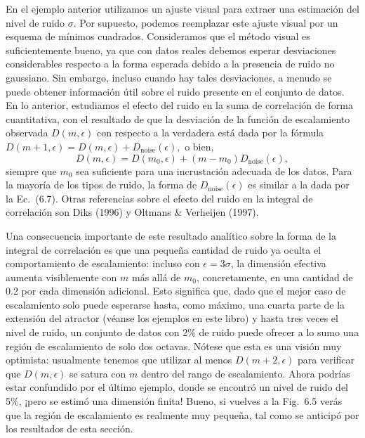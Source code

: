 \documentclass[10pt,a4paper]{book}
\begin{document}
En el ejemplo anterior utilizamos un ajuste visual para extraer una estimación del nivel de ruido $\sigma$. Por supuesto, podemos reemplazar este ajuste visual por un esquema de mínimos cuadrados. Consideramos que el método visual es suficientemente bueno, ya que con datos reales debemos esperar desviaciones considerables respecto a la forma esperada debido a la presencia de ruido no gaussiano. Sin embargo, incluso cuando hay tales desviaciones, a menudo se puede obtener información útil sobre el ruido presente en el conjunto de datos. En lo anterior, estudiamos el efecto del ruido en la suma de correlación de forma cuantitativa, con el resultado de que la desviación de la función de escalamiento observada $D(m, \epsilon)$ con respecto a la verdadera está dada por la fórmula $D(m+1, \epsilon) = D(m, \epsilon) + D_{\text{noise}}(\epsilon),$ o bien,
\begin{equation}
D(m, \epsilon) = D(m_0, \epsilon) + (m - m_0) D_{\text{noise}}(\epsilon),
\end{equation}
siempre que $m_0$ sea suficiente para una incrustación adecuada de los datos. Para la mayoría de los tipos de ruido, la forma de $D_{\text{noise}}(\epsilon)$ es similar a la dada por la Ec.~(6.7). Otras referencias sobre el efecto del ruido en la integral de correlación son Diks (1996) y Oltmans \& Verheijen (1997).

\bigskip

Una consecuencia importante de este resultado analítico sobre la forma de la integral de correlación es que una pequeña cantidad de ruido ya oculta el comportamiento de escalamiento: incluso con $\epsilon = 3\sigma$, la dimensión efectiva aumenta visiblemente con $m$ más allá de $m_0$, concretamente, en una cantidad de 0.2 por cada dimensión adicional. Esto significa que, dado que el mejor caso de escalamiento solo puede esperarse hasta, como máximo, una cuarta parte de la extensión del atractor (véanse los ejemplos en este libro) y hasta tres veces el nivel de ruido, un conjunto de datos con 2\% de ruido puede ofrecer a lo sumo una región de escalamiento de solo dos octavas. Nótese que esta es una visión muy optimista: usualmente tenemos que utilizar al menos $D(m+2, \epsilon)$ para verificar que $D(m, \epsilon)$ se satura con $m$ dentro del rango de escalamiento. Ahora podrías estar confundido por el último ejemplo, donde se encontró un nivel de ruido del 5\%, ¡pero se estimó una dimensión finita! Bueno, si vuelves a la Fig.~6.5 verás que la región de escalamiento es realmente muy pequeña, tal como se anticipó por los resultados de esta sección.
\end{document}
